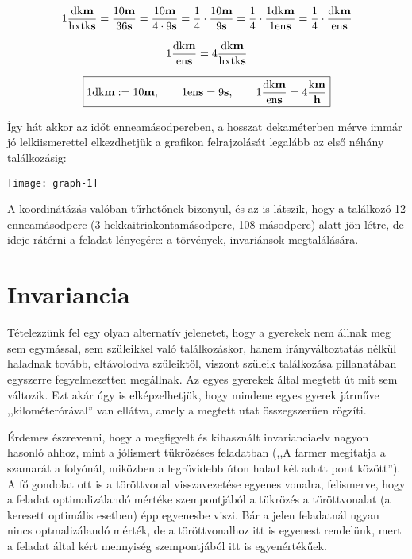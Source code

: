 \documentclass{article}
\begin{document}
	\[1 \frac{\text{dk\bf m}}{\text{hxtk\bf s}} = \frac{10 \text{\bf m}}{36 \text{\bf s}} = \frac{10 \text{\bf m}}{4\cdot9 \text{\bf s}} = \frac14\cdot\frac{10 \text{\bf m}}{9 \text{\bf s}} = \frac14 \cdot \frac{1\text{dk\bf m}}{1\text{en\bf s}} = \frac14 \cdot \frac{\text{dk\bf m}}{\text{en\bf s}}\]

	\[1\frac{\text{dk\bf m}}{\text{en\bf s}} = 4 \frac{\text{dk\bf m}}{\text{hxtk\bf s}}\]

	\[\boxed{1\text{dk\bf m} := 10\text{\bf m},\hspace{2em}1\text{en\bf s} = 9 \text{\bf s},\hspace{2em}1\frac{\text{dk\bf m}}{\text{en\bf s}} = 4\frac{\text{k\bf m}}{\text{\bf h}}}\]

	Így hát akkor az időt enneamásodpercben, a hosszat dekaméterben mérve immár jó lelkiismerettel elkezdhetjük a grafikon felrajzolását legalább az első néhány találkozásig:

	\texttt{[image: graph-1]}

	A koordinátázás valóban tűrhetőnek bizonyul, és az is látszik, hogy a találkozó 12 enneamásodperc (3 hekkai\-triakonta\-másodperc, 108 másodperc) alatt jön létre, de ideje rátérni a feladat lényegére: a törvények, invariánsok megtalálására.

	\section{Invariancia}

	Tételezzünk fel egy olyan alternatív jelenetet, hogy a gyerekek nem állnak meg sem egymással, sem szüleikkel való találkozáskor, hanem irányváltoztatás nélkül haladnak tovább, eltávolodva szüleiktől, viszont  szüleik találkozása pillanatában egyszerre fegyelmezetten megállnak. Az egyes gyerekek által megtett út mit sem változik. Ezt akár úgy is elképzelhetjük, hogy mindene egyes gyerek járműve ,,kilométerórával'' van ellátva, amely a megtett utat összegszerűen rögzíti.

	Érdemes észrevenni, hogy a megfigyelt és kihasznált invarianciaelv nagyon hasonló ahhoz, mint a jólismert tükrözéses feladatban (,,A farmer megitatja a szamarát a folyónál, miközben a legrövidebb úton halad két adott pont között''). A fő gondolat ott is a töröttvonal visszavezetése egyenes vonalra, felismerve, hogy a feladat optimalizálandó mértéke szempontjából a tükrözés a töröttvonalat (a keresett optimális esetben) épp egyenesbe viszi. Bár a jelen feladatnál ugyan nincs optmalizálandó mérték, de a töröttvonalhoz itt is egyenest rendelünk, mert a feladat által kért mennyiség szempontjából itt is egyenértékűek.
\end{document}
